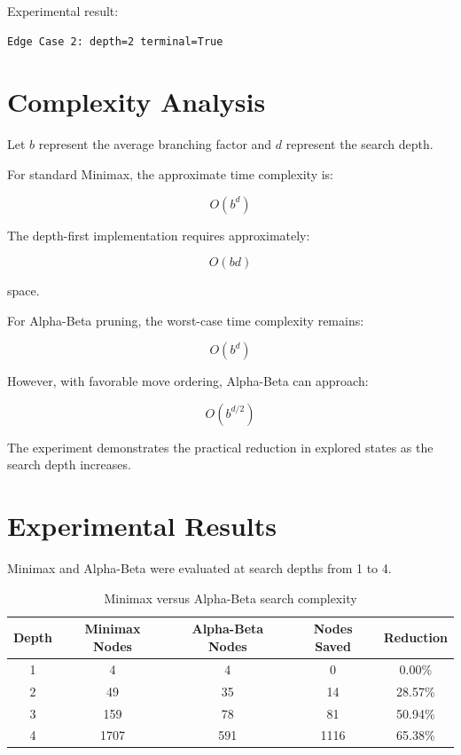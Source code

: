 \documentclass[12pt,a4paper]{article}
\begin{document}
Experimental result:

\begin{verbatim}
Edge Case 2: depth=2 terminal=True
\end{verbatim}


\section{Complexity Analysis}

Let $b$ represent the average branching factor and $d$ represent the search
depth.

For standard Minimax, the approximate time complexity is:

\begin{equation}
O(b^d)
\end{equation}

The depth-first implementation requires approximately:

\begin{equation}
O(bd)
\end{equation}

space.

For Alpha-Beta pruning, the worst-case time complexity remains:

\begin{equation}
O(b^d)
\end{equation}

However, with favorable move ordering, Alpha-Beta can approach:

\begin{equation}
O(b^{d/2})
\end{equation}

The experiment demonstrates the practical reduction in explored states as
the search depth increases.


\section{Experimental Results}

Minimax and Alpha-Beta were evaluated at search depths from 1 to 4.

\begin{table}[H]
\centering
\begin{tabular}{ccccc}
\toprule
\textbf{Depth} &
\textbf{Minimax Nodes} &
\textbf{Alpha-Beta Nodes} &
\textbf{Nodes Saved} &
\textbf{Reduction} \\
\midrule
1 & 4 & 4 & 0 & 0.00\% \\
2 & 49 & 35 & 14 & 28.57\% \\
3 & 159 & 78 & 81 & 50.94\% \\
4 & 1707 & 591 & 1116 & 65.38\% \\
\bottomrule
\end{tabular}
\caption{Minimax versus Alpha-Beta search complexity}
\end{table}
\end{document}
